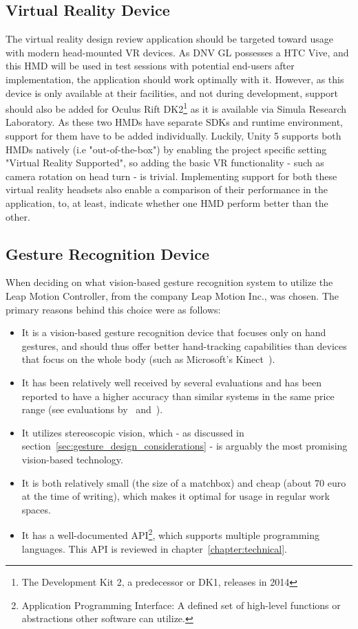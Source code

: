 \subsection{Virtual Reality Device}
The virtual reality design review application should be targeted toward usage with modern head-mounted VR devices.
As DNV GL possesses a HTC Vive, and this HMD will be used in test sessions with potential end-users after implementation, 
the application should work optimally with it. However, as this device is only available at their facilities, and not during development, support 
should also be added for Oculus Rift DK2\footnote{The Development Kit 2, a predecessor or DK1, releases in 2014} as it is available via Simula Research Laboratory.
As these two HMDs have separate SDKs and runtime environment, support for them have to be added individually. 
Luckily, Unity 5 supports both HMDs natively (i.e "out-of-the-box") by enabling the project specific setting "Virtual Reality Supported", 
so adding the basic VR functionality - such as camera rotation on head turn - is trivial. 
Implementing support for both these virtual reality headsets also enable a comparison of their performance in the application, to, at least, indicate whether 
one HMD perform better than the other. 

\subsection{Gesture Recognition Device}
When deciding on what vision-based gesture recognition system to utilize the Leap Motion Controller, from the company Leap Motion Inc., was chosen.
The primary reasons behind this choice were as follows: 
\begin{itemize}
    \item It is a vision-based gesture recognition device that focuses only on hand gestures, and should thus offer better hand-tracking capabilities than devices that focus 
          on the whole body (such as Microsoft's Kinect~\citep{Zhang2012}).
    \item It has been relatively well received by several evaluations and has been reported to have a higher accuracy than similar systems in the same price range
            (see evaluations by~\citet{Weichert2013} and~\citet{Guna2014}).
    \item It utilizes stereoscopic vision, which - as discussed in section~\vref{sec:gesture_design_considerations} - is arguably the most promising vision-based technology.
    \item It is both relatively small (the size of a matchbox) and cheap (about 70 euro at the time of writing), which makes it optimal for usage in regular work spaces. 
    \item It has a well-documented API\footnote{Application Programming Interface: A defined set of high-level functions or abstractions other software can utilize.}, which 
          supports multiple programming languages. This API is reviewed in chapter~\ref{chapter:technical}.
\end{itemize}

